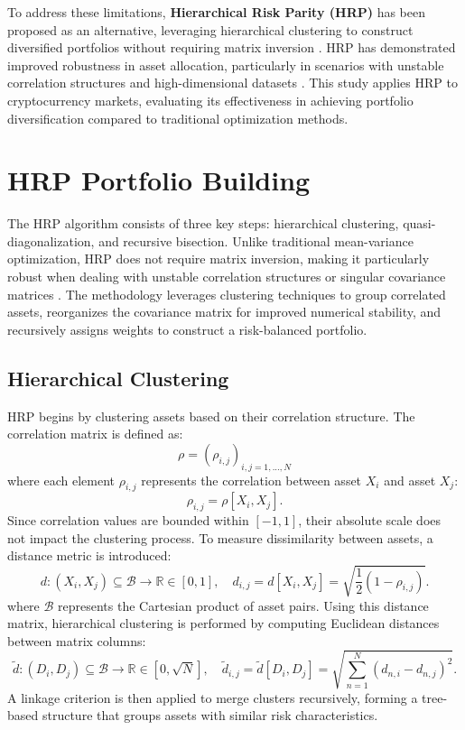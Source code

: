 \documentclass[english]{maciarticle}
\begin{document}
To address these limitations, \textbf{Hierarchical Risk Parity (HRP)} has been proposed as an alternative, leveraging hierarchical clustering to construct diversified portfolios without requiring matrix inversion \cite{lopez2016}. HRP has demonstrated improved robustness in asset allocation, particularly in scenarios with unstable correlation structures and high-dimensional datasets \cite{lopez2018}. This study applies HRP to cryptocurrency markets, evaluating its effectiveness in achieving portfolio diversification compared to traditional optimization methods.

\section{HRP Portfolio Building}

The HRP algorithm consists of three key steps: hierarchical clustering, quasi-diagonalization, and recursive bisection. Unlike traditional mean-variance optimization, HRP does not require matrix inversion, making it particularly robust when dealing with unstable correlation structures or singular covariance matrices \cite{lopez2018}. The methodology leverages clustering techniques to group correlated assets, reorganizes the covariance matrix for improved numerical stability, and recursively assigns weights to construct a risk-balanced portfolio.

\subsection{Hierarchical Clustering}

HRP begins by clustering assets based on their correlation structure. The correlation matrix is defined as:
\[
\rho = \left( \rho_{i,j} \right)_{i,j=1,...,N}
\]
where each element \(\rho_{i,j}\) represents the correlation between asset \(X_i\) and asset \(X_j\):
\[
\rho_{i,j} = \rho[X_i, X_j].
\]
Since correlation values are bounded within \([-1,1]\), their absolute scale does not impact the clustering process. To measure dissimilarity between assets, a distance metric is introduced:
\[
d : (X_i, X_j) \subseteq \mathcal{B} \to \mathbb{R} \in [0, 1], \quad d_{i,j} = d[X_i, X_j] = \sqrt{\frac{1}{2}(1 - \rho_{i,j})}.
\]
where \(\mathcal{B}\) represents the Cartesian product of asset pairs. Using this distance matrix, hierarchical clustering is performed by computing Euclidean distances between matrix columns:
\[
\tilde{d} : (D_i, D_j) \subseteq \mathcal{B} \to \mathbb{R} \in [0, \sqrt{N}], \quad \tilde{d}_{i,j} = \tilde{d}[D_i, D_j] = \sqrt{\sum_{n=1}^N (d_{n,i} - d_{n,j})^2}.
\]
A linkage criterion is then applied to merge clusters recursively, forming a tree-based structure that groups assets with similar risk characteristics.
\end{document}

